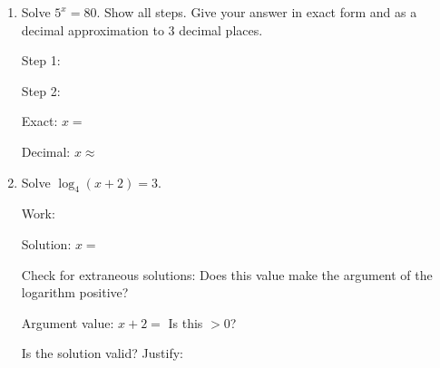 \documentclass[10pt]{article}
\begin{document}
\namedateperiod

\vspace{0.14in}

\begin{enumerate}[leftmargin=1.8em, itemsep=18pt]

\item Solve $5^x = 80$. Show all steps. Give your answer in exact form and as a decimal
      approximation to 3 decimal places.

\vspace{6pt}
Step 1: \writeline

\vspace{6pt}
Step 2: \writeline

\vspace{6pt}
Exact: $x = $ \blank{5cm}

\vspace{6pt}
Decimal: $x \approx $ \blank{3cm}

\vspace{10pt}

\item Solve $\log_4(x + 2) = 3$.

\vspace{6pt}
Work:

\vspace{6pt}
\writeline

\vspace{8pt}
Solution: $x = $ \blank{3cm}

\vspace{8pt}
Check for extraneous solutions: Does this value make the argument of the logarithm positive?

\vspace{6pt}
Argument value: $x + 2 = $ \blank{2.5cm} \qquad Is this $> 0$? \blank{2cm}

\vspace{6pt}
Is the solution valid? \blank{3cm}  Justify: \writeline

\end{enumerate}
\end{document}
